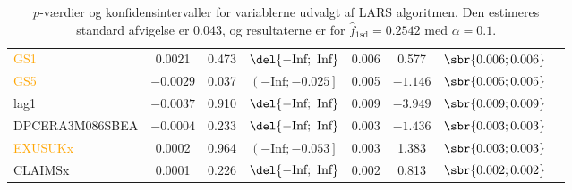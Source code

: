 \begin{table}[ht]
{\begin{tabular}{lccccccc}
\textcolor{orange}{GS1} &0.0021 &0.473  &    $\del{-\text{Inf}   ;  \text{ Inf} }$ &   0.006&   0.577   &$\sbr{0.006 ;0.006}$ \\  
\textcolor{orange}{GS5} &$-0.0029$&0.037 &     $\left( -\text{Inf}   ;  -0.025\right]   $& 0.005 & $-1.146 $ & $\sbr{0.005 ;0.005 }$\\  
 \textcolor{blue3}{lag1} &$-0.0037$ & 0.910   & $\del{-\text{Inf}   ;  \text{ Inf} }$  & 0.009  &$-3.949$  &$\sbr{0.009; 0.009 }$ \\ 
 \textcolor{red3}{DPCERA3M086SBEA} &$-0.0004$& 0.233  &   $\del{-\text{Inf}   ;  \text{ Inf} }$ & 0.003 & $-1.436$&  $\sbr{0.003; 0.003}$ \\ 
\textcolor{orange}{ EXUSUKx} &0.0002  & 0.964   &   $\left( -\text{Inf}     ;-0.053 \right] $&  0.003   &1.383&  $\sbr{0.003; 0.003 }$   \\   
 \textcolor{blue3}{CLAIMSx} &0.0001& 0.226 &    $\del{-\text{Inf}   ;  \text{ Inf} }$&0.002 &  0.813  & $\sbr{0.002 ;0.002 }$   \\ 
\bottomrule
\end{tabular}  
}
\caption{\(p\)-værdier og konfidensintervaller for variablerne udvalgt af LARS algoritmen. Den estimeres standard afvigelse er \(0.043\), og resultaterne er for \(\widehat{f}_{1 \text{sd}} = 0.2542\) med \(\alpha = 0.1\).} \label{tab:larInf_kryds}
\end{table} 
